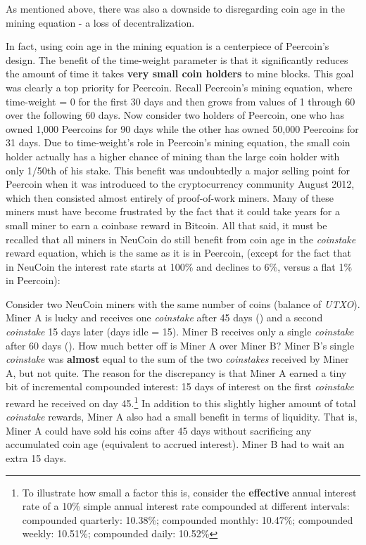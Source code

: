 \documentclass[a4paper,11pt]{article}
\begin{document}
As mentioned above, there was also a downside to disregarding coin age in the mining equation - a loss of decentralization. 

In fact, using coin age in the mining equation is a centerpiece of Peercoin's design. The benefit of the time-weight parameter is that it significantly reduces the amount of time it takes \textbf{very small coin holders} to mine blocks. This goal was clearly a top priority for Peercoin. Recall Peercoin's mining equation, where time-weight = 0 for the first 30 days and then grows from values of 1 through 60 over the following 60 days. Now consider two holders of Peercoin, one who has owned 1,000 Peercoins for 90 days while the other has owned 50,000 Peercoins for 31 days. Due to time-weight's role in Peercoin's mining equation, the small coin holder actually has a higher chance of mining than the large coin holder with only 1/50th of his stake. This benefit was undoubtedly a major selling point for Peercoin when it was introduced to the cryptocurrency community August 2012, which then consisted almost entirely of proof-of-work miners. Many of these miners must have become frustrated by the fact that it could take years for a small miner to earn a coinbase reward in Bitcoin.
All that said, it must be recalled that all miners in NeuCoin do still benefit from coin age in the \textit{coinstake} reward equation, which is the same as it is in Peercoin, (except for the fact that in NeuCoin the interest rate starts at 100\% and declines to 6\%, versus a flat 1\% in Peercoin):



Consider two NeuCoin miners with the same number of coins (balance of \textit{UTXO}). Miner A is lucky and receives one \textit{coinstake} after 45 days () and a second \textit{coinstake} 15 days later (days idle = 15). Miner B receives only a single \textit{coinstake} after 60 days (). How much better off is Miner A over Miner B? Miner B's single \textit{coinstake} was \textbf{almost} equal to the sum of the two \textit{coinstakes} received by Miner A, but not quite. The reason for the discrepancy is that Miner A earned a tiny bit of incremental compounded interest: 15 days of interest on the first \textit{coinstake} reward he received on day 45.\footnote{To illustrate how small a factor this is, consider the \textbf{effective} annual interest rate of a 10\% simple annual interest rate compounded at different intervals: compounded quarterly: 10.38\%; compounded monthly: 10.47\%; compounded weekly: 10.51\%; compounded daily: 10.52\%} In addition to this slightly higher amount of total \textit{coinstake} rewards, Miner A also had a small benefit in terms of liquidity. That is, Miner A could have sold his coins after 45 days without sacrificing any accumulated coin age (equivalent to accrued interest). Miner B had to wait an extra 15 days.
\end{document}
